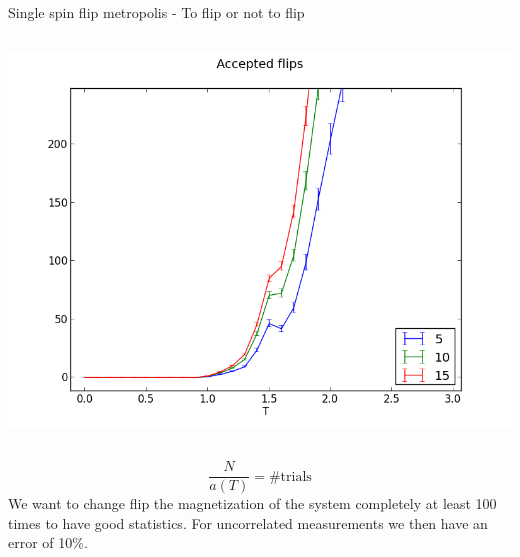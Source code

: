 \documentclass[]{beamer}
\begin{document}
\begin{frame}{Single spin flip metropolis - To flip or not to flip}
\begin{columns}[c]
		\includegraphics[width=\textwidth]{img/single_noAcceptedFlips.png}
\end{columns}
 {\[ \frac{N}{a(T)} = \text{\# trials} \]}
 {We want to change flip the magnetization of the system completely at least 100 times to have good statistics. For uncorrelated measurements we then have an error of 10\%.}
\end{frame}
\end{document}
